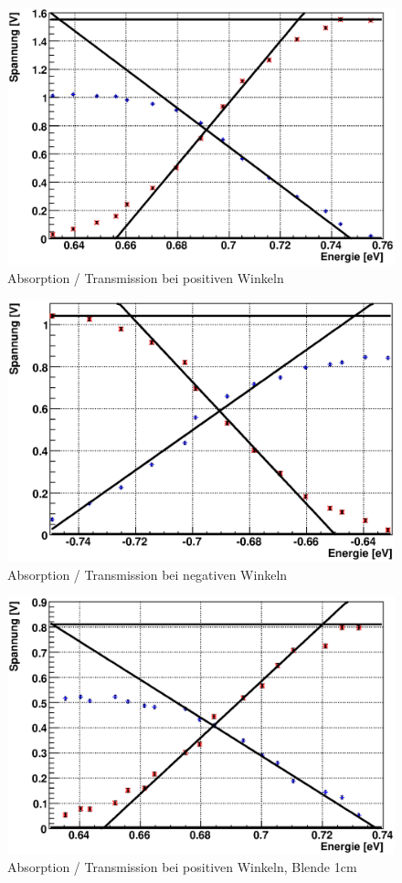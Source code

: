 \documentclass[12pt]{article}
\begin{document}
\begin{figure}[H]  
\centering
\includegraphics[width=0.9\linewidth]{pictures/bandluecke/grge2.eps}
\caption{Absorption / Transmission bei positiven Winkeln}
\end{figure}

\begin{figure}[H]  
\centering
\includegraphics[width=0.9\linewidth]{pictures/bandluecke/grge2b.eps}
\caption{Absorption / Transmission bei negativen Winkeln}
\end{figure}

\begin{figure}[H]  
\centering
\includegraphics[width=0.9\linewidth]{pictures/bandluecke/grgeb1.eps}
\caption{Absorption / Transmission bei positiven Winkeln, Blende 1cm}
\end{figure}
\end{document}
